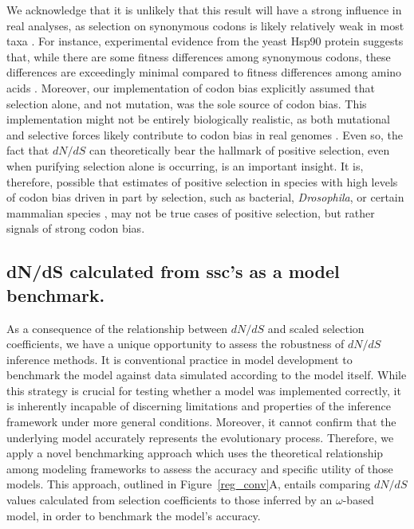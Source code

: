 \documentclass{pnastwo}
\begin{document}
\begin{article}
We acknowledge that it is unlikely that this result will have a strong influence in real analyses, as selection on synonymous codons is likely relatively weak in most taxa \cite{HershbergPetrov2008}. For instance, experimental evidence from the yeast Hsp90 protein suggests that, while there are some fitness differences among synonymous codons, these differences are exceedingly minimal compared to fitness differences among amino acids \cite{Hietpas2011,Hietpas2013}. Moreover, our implementation of codon bias explicitly assumed that selection alone, and not mutation, was the sole source of codon bias. This implementation might not be entirely biologically realistic, as both mutational and selective forces likely contribute to codon bias in real genomes \cite{Blumer1991, Duret2002, HershbergPetrov2008, Chen2009, PlotkinKudla2010}. Even so, the fact that $dN/dS$ can theoretically bear the hallmark of positive selection, even when purifying selection alone is occurring, is an important insight. It is, therefore, possible that estimates of positive selection in species with high levels of codon bias driven in part by selection, such as bacterial, \textit{Drosophila}, or certain mammalian species \cite{Duret2002, Chamaryetal2006, PlotkinKudla2010}, may not be true cases of positive selection, but rather signals of strong codon bias. 

\subsection*{dN/dS calculated from ssc's as a model benchmark.}

As a consequence of the relationship between $dN/dS$ and scaled selection coefficients, we have a unique opportunity to assess the robustness of $dN/dS$ inference methods. It is conventional practice in model development to benchmark the model against data simulated according to the model itself. While this strategy is crucial for testing whether a model was implemented correctly, it is inherently incapable of discerning limitations and properties of the inference framework under more general conditions. Moreover, it cannot confirm that the underlying model accurately represents the evolutionary process. Therefore, we apply a novel benchmarking approach which uses the theoretical relationship among modeling frameworks to assess the accuracy and specific utility of those models. This approach, outlined in Figure~\ref{reg_conv}A, entails comparing $dN/dS$ values calculated from selection coefficients to those inferred by an $\omega$-based model, in order to benchmark the model's accuracy.


\end{article}
\end{document}

